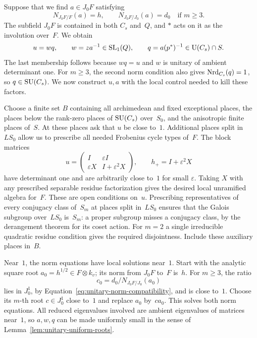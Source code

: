 Suppose that we find $a\in J_0F$ satisfying
\begin{equation}\label{eq:unitary-simultaneous-norms}
 N_{J_0F/F}(a)=h,
 \qquad N_{J_0F/J_0}(a)=d_0\quad\text{if }m\geq3.
\end{equation}
The subfield $J_0F$ is contained in both $C_s$ and~$Q$, and $*$ acts
on it as the involution over~$F$.  We obtain
\begin{equation}\label{eq:unitary-factorization}
 u=wq,\qquad w=za^{-1}\in\operatorname{SL}_1(Q),\qquad
 q=a(p^*)^{-1}\in\operatorname{U}(C_s)\cap S.
\end{equation}
The last membership follows because $wq=u$ and $w$ is unitary of
ambient determinant one.  For $m\geq3$, the second norm condition
also gives $\operatorname{Nrd}_{C_s}(q)=1$, so $q\in\operatorname{SU}(C_s)$.  We now construct
$u,a$ with the local control needed to kill these factors.

Choose a finite set $B$ containing all archimedean and fixed
exceptional places, the places below the rank-zero places of
$\operatorname{SU}(C_s)$ over~$S_0$, and the anisotropic finite places of~$S$.
At these places ask that $u$ be close to~$1$.  Additional places
split in~$LS_0$ allow us to prescribe all needed Frobenius cycle
types of~$F$.  The block matrices
\begin{equation}\label{eq:unitary-near-identity-model}
 u=\begin{pmatrix}I&\varepsilon I\\
                  \varepsilon X&I+\varepsilon^2X\end{pmatrix},
 \qquad h_+=I+\varepsilon^2X
\end{equation}
have determinant one and are arbitrarily close to~$1$ for small
$\varepsilon$.  Taking $X$ with any prescribed separable residue
factorization gives the desired local unramified algebra for~$F$.
These are open conditions on~$u$.  Prescribing representatives of
every conjugacy class of~$S_m$ at places split in~$LS_0$ ensures that
the Galois subgroup over~$LS_0$ is~$S_m$: a proper subgroup misses a
conjugacy class, by the derangement theorem for its coset action.
For $m=2$ a single irreducible quadratic residue condition gives the
required disjointness.  Include these auxiliary places in~$B$.

Near~$1$, the norm equations have local solutions near~$1$.  Start
with the analytic square root $a_0=h^{1/2}\in F\otimes k_v$; its norm
from $J_0F$ to~$F$ is~$h$.  For $m\geq3$, the ratio
\[
 c_0=d_0/N_{J_0F/J_0}(a_0)
\]
lies in $J_0^1$, by Equation~\eqref{eq:unitary-norm-compatibility},
and is close to~$1$.  Choose its $m$-th root $c\in J_0^1$ close to~$1$
and replace $a_0$ by~$ca_0$.  This solves both norm equations.  All
reduced eigenvalues involved are ambient eigenvalues of matrices
near~$1$, so $a,w,q$ can be made uniformly small in the sense of
Lemma~\ref{lem:unitary-uniform-roots}.

